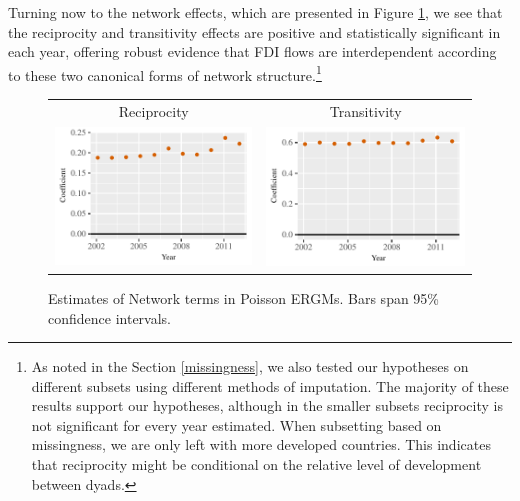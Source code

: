 \documentclass[reqno,onecolumn,letterpaper,12pt]{article}
\begin{document}
Turning now to the network effects, which are presented in Figure \ref{fig:net_effects}, we see that the reciprocity and transitivity effects are positive and statistically significant in each year, offering robust evidence that FDI flows are interdependent according to these two canonical forms of network structure.\footnote{As noted in the Section \ref{missingness}, we also tested our hypotheses on different subsets using different methods of imputation. The majority of these results support our hypotheses, although in the smaller subsets reciprocity is not significant for every year estimated. When subsetting based on missingness, we are only left with more developed countries. This indicates that reciprocity might be conditional on the relative level of development between dyads.}
\begin{figure}[htp]
\centering
\begin{tabular}{c@{\hskip -.4cm}c}
Reciprocity &
Transitivity\\
\includegraphics[height=.2\textheight, clip=true, trim=0cm .5cm 0cm .1cm]{draft_figures/rl_plots/Mutuality.pdf}    &
\includegraphics[height=.2\textheight, clip=true, trim=.5cm .5cm 0cm .1cm]{draft_figures/rl_plots/Transitivity.pdf}   \\
\end{tabular}
\caption{\label{fig:net_effects} Estimates of Network terms in Poisson ERGMs. Bars span 95\% confidence intervals.}
\end{figure}
\end{document}
